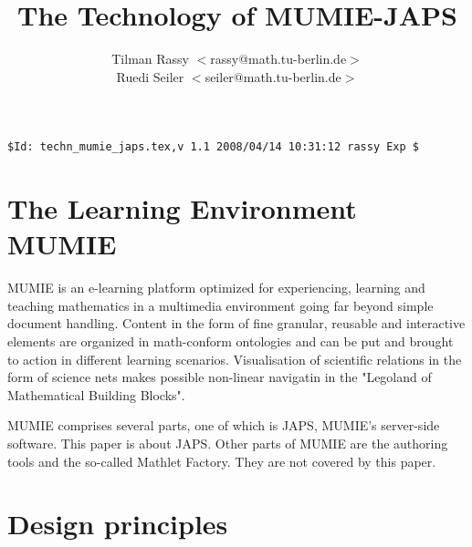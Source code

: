 \documentclass[a4paper,11pt]{article}
\title{The Technology of MUMIE-JAPS}
\author{Tilman Rassy $<$rassy@math.tu-berlin.de$>$\\ Ruedi Seiler $<$seiler@math.tu-berlin.de$>$}
\begin{document}
\maketitle


\begin{center}
{\verb'$Id: techn_mumie_japs.tex,v 1.1 2008/04/14 10:31:12 rassy Exp $'}
\end{center}

\section{The Learning Environment MUMIE}

MUMIE is an e-learning platform optimized for experiencing, learning and
teaching mathematics in a multimedia environment going far beyond simple
document handling. Content in the form of fine granular, reusable and
interactive elements are organized in math-conform ontologies and can be
put and brought to action in different learning scenarios.  Visualisation
of scientific relations in the form of science nets makes possible
non-linear navigatin in the "Legoland of Mathematical Building Blocks".

MUMIE comprises several parts, one of which is JAPS, MUMIE's server-side
software. This paper is about JAPS. Other parts of MUMIE are the authoring
tools and the so-called Mathlet Factory. They are not covered by this paper.


\section{Design principles}
\end{document}
